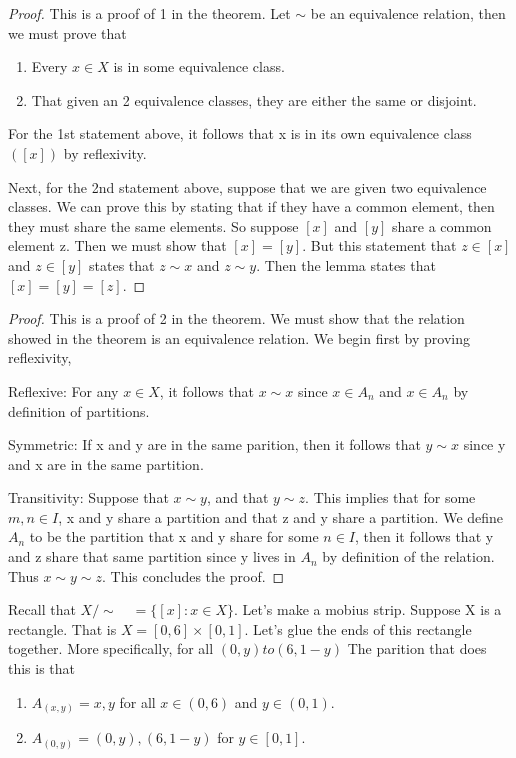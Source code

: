\documentclass{article}
\begin{document}
\begin{proof}
    This is a proof of 1 in the theorem. Let $\sim$ be an equivalence relation, then we must prove that 
    \begin{enumerate}
        \item Every $x \in X$ is in some equivalence class.
        \item That given an 2 equivalence classes, they are either the same or disjoint. 
    \end{enumerate}
    For the 1st statement above, it follows that x is in its own equivalence class $([x])$ by reflexivity. 

    Next, for the 2nd statement above, suppose that we are given two equivalence classes. We can prove this by stating that if they have a common element, then they must share the same elements. So 
    suppose $[x]$ and $[y]$ share a common element z. Then we must show that $[x] = [y]$. But this statement that $z \in [x]$ and $z \in [y]$ states that $z \sim x$ and $z \sim y$. Then the lemma states that $[x] = [y] = [z]$. 
\end{proof}

\begin{proof}
    This is a proof of 2 in the theorem. We must show that the relation showed in the theorem is an equivalence relation. We begin first by proving reflexivity, 

    Reflexive: For any $x \in X$, it follows that $x \sim x$ since $x \in A_n$ and $x \in A_n$ by definition of partitions. 

    Symmetric: If x and y are in the same parition, then it follows that $y \sim x$ since y and x are in the same partition.

    Transitivity: Suppose that $x \sim y$, and that $y \sim z$. This implies that for some $m, n \in I$, x and y share a partition and that z and y share a partition. We define $A_n$ to be the partition that x and y share for some $n \in I$, then it follows
    that y and z share that same partition since y lives in $A_n$ by definition of the relation. Thus $x \sim y \sim z$. This concludes the proof.  
\end{proof}

Recall that $X/\sim \quad = \{[x]: x \in X\}$. Let's make a mobius strip. Suppose X is a rectangle. That is $X = [0,6] \times [0,1]$. Let's glue the ends of this rectangle together. More specifically, 
for all $(0,y) to (6, 1 - y)$ The parition that does this is that 
\begin{enumerate}
    \item $A_{(x,y)} = {x,y}$ for all $x \in (0,6)$ and $y \in (0,1)$. 
    \item $A_{(0,y)} = {(0,y), (6,1-y)}$ for $y \in [0,1]$. 
\end{enumerate}
\end{document}
